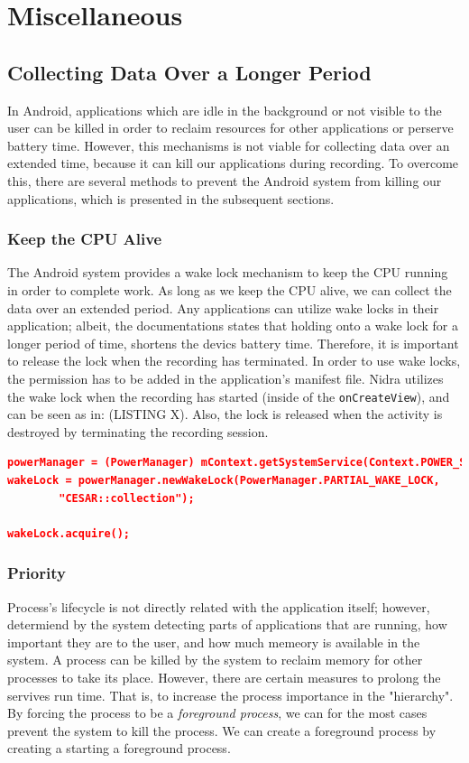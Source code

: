 

\section{Miscellaneous}

\subsection{Collecting Data Over a Longer Period}
In Android, applications which are idle in the background or not visible to the user can be killed in order to reclaim resources for other applications or perserve battery time. However, this mechanisms is not viable for collecting data over an extended time, because it can kill our applications during recording. To overcome this, there are several methods to prevent the Android system from killing our applications, which is presented in the subsequent sections.

\subsubsection{Keep the CPU Alive}
The Android system provides a wake lock mechanism to keep the CPU running in order to complete work. As long as we keep the CPU alive, we can collect the data over an extended period. Any applications can utilize wake locks in their application; albeit, the documentations states that holding onto a wake lock for a longer period of time, shortens the devics battery time. Therefore, it is important to release the lock when the recording has terminated. In order to use wake locks, the permission has to be added in the application's manifest file. Nidra utilizes the wake lock when the recording has started (inside of the \verb|onCreateView|), and can be seen as in: (LISTING X). Also, the lock is released when the activity is destroyed by terminating the recording session.

\begin{lstlisting}[language=json, caption={My Caption}, captionpos=b]
powerManager = (PowerManager) mContext.getSystemService(Context.POWER_SERVICE);
wakeLock = powerManager.newWakeLock(PowerManager.PARTIAL_WAKE_LOCK,
        "CESAR::collection");

wakeLock.acquire();
\end{lstlisting}


\subsubsection{Priority}
Process's lifecycle is not directly related with the application itself; however, determiend by the system detecting parts of applications that are running, how important they are to the user, and how much memeory is available in the system. A process can be killed by the system to reclaim memory for other processes to take its place. However, there are certain measures to prolong the servives run time. That is, to increase the process importance in the "hierarchy". By forcing the process to be a \textit{foreground process}, we can for the most cases prevent the system to kill the process. We can create a foreground process by creating a starting a foreground process. 

